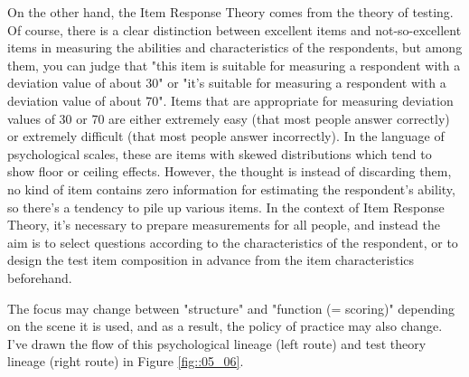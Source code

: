 \documentclass{ltjsbook}
\begin{document}
On the other hand, the Item Response Theory comes from the theory of testing. Of course, there is a clear distinction between excellent items and not-so-excellent items in measuring the abilities and characteristics of the respondents, but among them, you can judge that "this item is suitable for measuring a respondent with a deviation value of about 30" or "it's suitable for measuring a respondent with a deviation value of about 70". Items that are appropriate for measuring deviation values of 30 or 70 are either extremely easy (that most people answer correctly) or extremely difficult (that most people answer incorrectly). In the language of psychological scales, these are items with skewed distributions which tend to show floor or ceiling effects. However, the thought is instead of discarding them, no kind of item contains zero information for estimating the respondent's ability, so there's a tendency to pile up various items. In the context of Item Response Theory, it's necessary to prepare measurements for all people, and instead the aim is to select questions according to the characteristics of the respondent, or to design the test item composition in advance from the item characteristics beforehand.

The focus may change between "structure" and "function (= scoring)" depending on the scene it is used, and as a result, the policy of practice may also change. I've drawn the flow of this psychological lineage (left route) and test theory lineage (right route) in Figure \ref{fig::05_06}.
\end{document}
